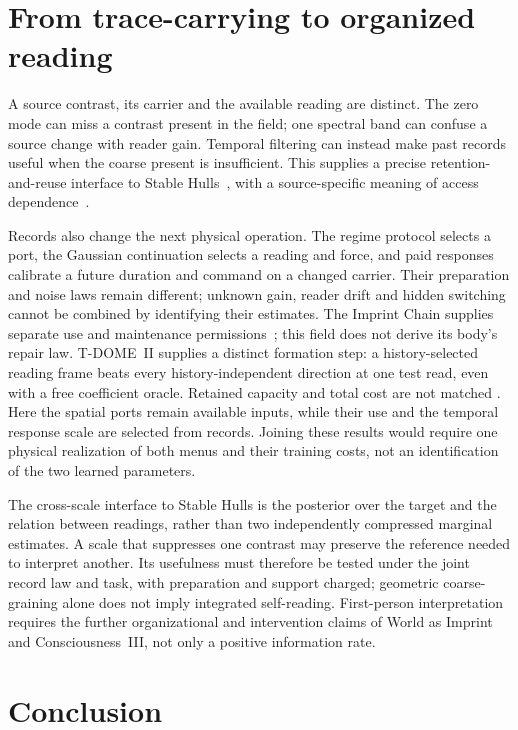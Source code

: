 \documentclass[12pt,a4paper]{article}
\begin{document}
\section{From trace-carrying to organized reading}

A source contrast, its carrier and the available reading are distinct.
The zero mode can miss a contrast present in the field; one spectral
band can confuse a source change with reader gain. Temporal filtering
can instead make past records useful when the coarse present is
insufficient. This supplies a precise retention-and-reuse interface
to Stable Hulls~\cite{StableHulls}, with a source-specific meaning of
access dependence~\cite{HAFFA}.

Records also change the next physical operation. The regime protocol
selects a port, the Gaussian continuation selects a reading and force,
and paid responses calibrate a future duration and command on a
changed carrier. Their preparation and noise laws remain different;
unknown gain, reader drift and hidden switching cannot be combined by
identifying their estimates. The Imprint Chain supplies separate
use and maintenance permissions~\cite{ImprintChain}; this field does
not derive its body's repair law. T-DOME~II supplies a distinct formation
step: a history-selected reading frame beats every history-independent
direction at one test read, even with a free coefficient oracle.
Retained capacity and total cost are not matched \cite{TDII}.
Here the spatial ports remain available
inputs, while their use and the temporal response scale are selected
from records. Joining these results would require one physical
realization of both menus and their training costs, not an identification
of the two learned parameters.

The cross-scale interface to Stable Hulls is the posterior over the
target and the relation between readings, rather than two independently
compressed marginal estimates. A scale that suppresses one contrast
may preserve the reference needed to interpret another. Its usefulness
must therefore be tested under the joint record law and task, with
preparation and support charged; geometric coarse-graining alone does
not imply integrated self-reading. First-person interpretation requires
the further organizational and intervention claims of World as Imprint
and Consciousness~III, not only a positive information rate.

\section{Conclusion}
\end{document}
